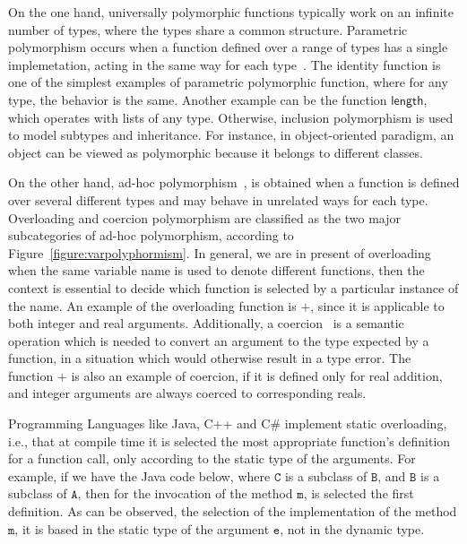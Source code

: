 \documentclass[hidelinks, twocolumn]{article}
\begin{document}
On the one hand, universally polymorphic functions typically work on an infinite number of types, where the types share a common structure. Parametric polymorphism occurs when a function defined over a range of types has a single implemetation, acting in the same way for each type~\cite{CardelliWegner, scott, wadlerBlott:popl89}. The identity function is one of the simplest examples of parametric polymorphic function, where for any type, the behavior is the same. Another example can be the function $\mathsf{length}$, which operates with lists of any type. Otherwise, inclusion polymorphism is used to model subtypes and inheritance. For instance, in object-oriented paradigm, an object can be viewed as polymorphic because it belongs to different classes.

On the other hand, ad-hoc polymorphism~\cite{CardelliWegner, wadlerBlott:popl89}, is obtained when a function is defined over several different types and may behave in unrelated ways for each type.  Overloading and coercion polymorphism are classified as the two major subcategories of ad-hoc polymorphism, according to Figure~\ref{figure:varpolyphormism}. In general, we are in present of overloading when the same variable name is used to denote different functions, then the context is essential to decide which function is selected by a particular instance of the name. An example of the overloading function is $+$, since it is applicable to both integer and real arguments. Additionally, a coercion~\cite{CardelliWegner} is a semantic operation which is needed to convert an argument to the type expected by a function, in a situation which would otherwise result in a type error. The function $+$ is also an example of coercion, if it is defined only for real addition, and integer arguments are always coerced to corresponding reals.

Programming Languages like Java, C++ and C\# implement static overloading, i.e., that at compile time it is selected the most appropriate  function's definition for a function call, only according to the static type of the arguments. For example, if we have the Java code below, where $\texttt{C}$ is a subclass of $\texttt{B}$, and $\texttt{B}$ is a subclass of $\texttt{A}$, then for the invocation of the method $\texttt{m}$, is selected the first definition. As can be observed, the selection of the implementation of the method $\texttt{m}$, it is based in the static type of the argument $\texttt{e}$, not in the dynamic type.      
                            
\end{document}
